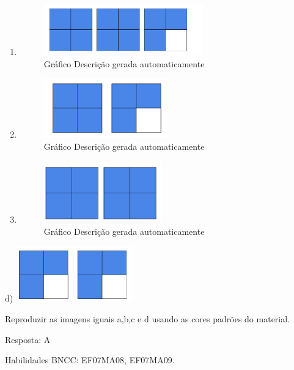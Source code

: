 {{{\begin{enumerate}
\def\labelenumi{\alph{enumi})}
\item
  \begin{figure}
  \centering
  \includegraphics[width=2.70952in,height=0.85605in]{./imgSAEB_7_MAT/media/image12.png}
  \caption{Gráfico Descrição gerada automaticamente}
  \end{figure}
\item
  \begin{figure}
  \centering
  \includegraphics[width=2.12619in,height=1.00858in]{./imgSAEB_7_MAT/media/image13.png}
  \caption{Gráfico Descrição gerada automaticamente}
  \end{figure}
\item
  \begin{figure}
  \centering
  \includegraphics[width=2.01937in,height=1.04937in]{./imgSAEB_7_MAT/media/image14.png}
  \caption{Gráfico Descrição gerada automaticamente}
  \end{figure}
\end{enumerate}

d)
\includegraphics[width=1.98287in,height=0.94874in]{./imgSAEB_7_MAT/media/image15.png}

Reproduzir as imagens iguais a,b,c e d usando as cores padrões do
material.

Resposta: A

Habilidades BNCC: EF07MA08, EF07MA09.

}}}
